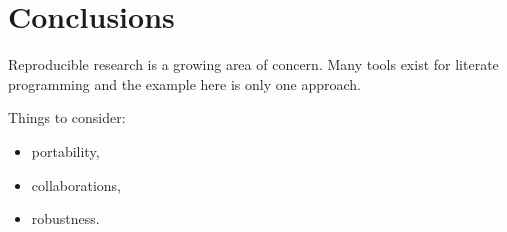% 
%
% 

\section{Conclusions \label{sec:conclusions}}

Reproducible research is a growing area of concern.  Many tools exist for
literate programming and the example here is only one approach.  

Things to consider: 
\begin{itemize}
  \item portability,
  \item collaborations,
  \item robustness.
\end{itemize}


